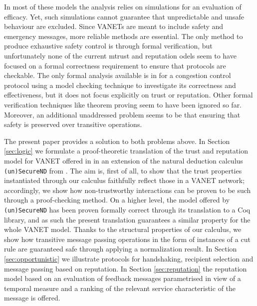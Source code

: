 \documentclass[compsoc, conference, letterpaper, 10pt, times]{IEEEtran}
\begin{document}
In most of these models the analysis relies on simulations for an evaluation of efficacy. Yet, such simulations cannot guarantee that unpredictable and unsafe behaviour are excluded. Since VANETs are meant to include safety and emergency messages, more reliable methods are essential. The only method to produce exhaustive safety control is through formal verification, but unfortunately none of the current mtrust and reputation odels seem to have focused on a formal correctness requirement to ensure that protocols are checkable. The only formal analysis available is in \cite{DBLP:conf/vtc/KonurF11} for a congestion control protocol using a model checking technique to investigate its correctness and effectiveness, but it does not focus explicitly on trust or reputation. Other formal verification techniques like theorem proving seem to have been ignored so far. Moreover, an additional unaddressed problem seems to be that ensuring that safety is preserved over transitive operations. 

The present paper provides a solution to both problems above. In Section \ref{sec:logic} we formulate a proof-theoretic translation of the trust and reputation model for VANET offered in \cite{glenford} in an extension of the natural deduction calculus \texttt{(un)SecureND} from \cite{DBLP:conf/ifiptm/Primiero16}. The aim is, first of all, to show that the trust properties instantiated through our calculus faithfully reflect those in a VANET network; accordingly, we show how non-trustworthy interactions can be proven to be such through a proof-checking method. On a higher level, the model offered by \texttt{(un)SecureND} has been proven formally correct through its translation to a Coq library, and as such the present translation guarantees a similar property for the whole VANET model. Thanks to the structural properties of our calculus, we show how transitive message passing operations in the form of instances of a cut rule are guaranteed safe through applying a normalization result. In Section \ref{sec:opportunistic} we illustrate protocols for handshaking, recipient selection and message passing based on reputation. In Section \ref{sec:reputation} the reputation model based on an evaluation of feedback messages parametrised in view of a temporal measure and a ranking of the relevant service characteristic of the message is offered.


\end{document}
